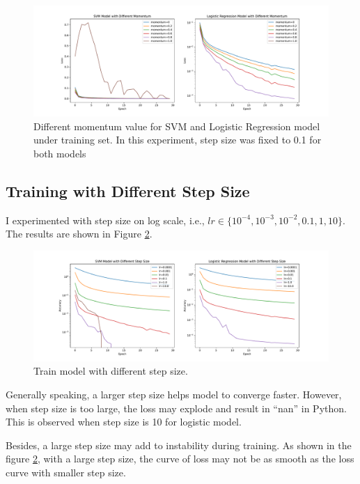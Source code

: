 \documentclass[12pt,letterpaper]{report}
\begin{document}

\begin{figure}[]
	\centering
	\includegraphics[width=\textwidth]{Two_Model_with_Different_Momentum.pdf}
	\caption{Different momentum value for SVM and Logistic Regression model under training set. In this experiment, step size was fixed to 0.1 for both models}
	\label{fig:momentum}
\end{figure}

\subsection*{Training with Different Step Size}
I experimented with step size on log scale, i.e., $lr \in \{10^{-4}, 10^{-3},10^{-2},0.1 ,1, 10\}$. The results are shown in Figure \ref{fig:step_size}.

\begin{figure}[h!]
	\centering
	\includegraphics[width=\textwidth]{Two_Models_with_Different_Step_Size}
	\caption{Train model with different step size.}
	\label{fig:step_size}
\end{figure}

Generally speaking, a larger step size helps model to converge faster. However, when step size is too large, the loss may explode and result in ``nan'' in Python. This is observed when step size is 10 for logistic model.

Besides, a large step size may add to instability during training. As shown in the figure \ref{fig:step_size}, with a large step size, the curve of loss may not be as smooth as the loss curve with smaller step size.
\end{document}
